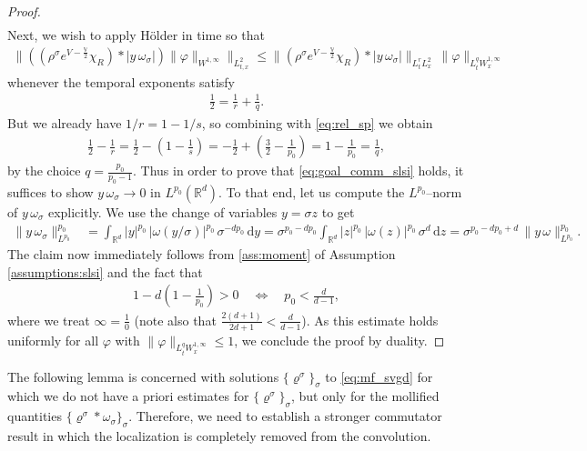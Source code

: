 \documentclass[reqno, 11pt]{amsart}
\numberwithin{equation}{section}
\theoremstyle{definition}
\begin{document}
\begin{proof}
\begin{align*}
\end{align*}
Next, we wish to apply H\"older in time so that
\begin{align*}
    \|((\rho^\sigma e^{V-\frac{\mathbb{V}}{2}}\chi_R)\ast|y\,\omega_\sigma|)\|\varphi\|_{W^{1,\infty}}\|_{L_{t,x}^2}\leq \|(\rho^\sigma e^{V-\frac{\mathbb{V}}{2}}\chi_R)\ast |y\,\omega_\sigma|\|_{L^r_tL^2_x}\,\|\varphi\|_{L^q_t W_x^{1,\infty}}
\end{align*}
whenever the temporal exponents satisfy
\begin{align*}
    \frac{1}{2}=\frac{1}{r}+\frac{1}{q}.
\end{align*}
But we already have $1/r=1-1/s$, so combining with \eqref{eq:rel_sp} we obtain
\begin{align*}
    \frac{1}{2}-\frac{1}{r}=\frac{1}{2}-\left(1-\frac{1}{s}\right)
    =-\frac{1}{2}+\left(\frac{3}{2}-\frac{1}{p_0}\right)=1-\frac{1}{p_0}
    =\frac{1}{q},
\end{align*}
by the choice $ q=\frac{p_0}{p_0-1}$. Thus in order to prove that \eqref{eq:goal_comm_slsi} holds, it suffices to show $y\,\omega_\sigma\to 0$ in $L^{p_0}(\mathbb{R}^{d})$. To that end, let us compute the $L^{p_0}$--norm of $y\,\omega_\sigma$ explicitly. We use the change of variables $y=\sigma z$ to get
\begin{align*}
    \|y\,\omega_\sigma\|_{L^{p_0}}^{p_0}
    &=\int_{\mathbb{R}^{d}} |y|^{p_0}\,|\omega(y/\sigma)|^{p_0}\,\sigma^{-dp_0}\,\mathrm{d} y
    = \sigma^{p_0-dp_0}\int_{\mathbb{R}^{d}} |z|^{p_0}\,|\omega(z)|^{p_0}\,\sigma^{d}\,\mathrm{d} z
    = \sigma^{p_0-dp_0+d}\,\|y\,\omega\|_{L^{p_0}}^{p_0}.
\end{align*}
The claim now immediately follows from \eqref{ass:moment} of Assumption \ref{assumptions:slsi} and the fact that
\begin{align*}
    1-d\left(1-\frac{1}{p_0}\right)>0
    \quad\Leftrightarrow\quad
    p_0<\frac{d}{d-1},
\end{align*}
where we treat $\infty=\frac{1}{0}$ (note also that $\frac{2(d+1)}{2d+1}<\frac{d}{d-1}$). As this estimate holds uniformly for all $\varphi$ with $\|\varphi\|_{L_t^q W_x^{1,\infty}}\leq 1$, we conclude the proof by duality.
\end{proof}

The following lemma is concerned with solutions $\{\varrho^\sigma\}_\sigma$ to \eqref{eq:mf_svgd} for which we do not have a priori estimates for $\{\varrho^\sigma\}_\sigma$, but only for the mollified quantities $\{\varrho^\sigma \ast \omega_{\sigma}\}_\sigma$. Therefore, we need to establish a stronger commutator result in which the localization is completely removed from the convolution.
\end{document}
